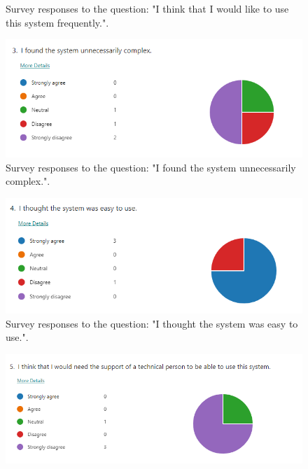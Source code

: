 \documentclass{l4proj}
\begin{document}
\begin{appendices}
\begin{figure}[h]
    \caption{Survey responses to the question: "I think that I would like to use this system frequently.".}
    \label{fig:usability1} 
\end{figure}

\begin{figure}[h]
    \centering
    \includegraphics[width=0.9\linewidth]{images/usability2.png}    

    \caption{Survey responses to the question: "I found the system unnecessarily complex.".}
    \label{fig:usability2} 
\end{figure}

\begin{figure}[h]
    \centering
    \includegraphics[width=0.9\linewidth]{images/usability3.png}    

    \caption{Survey responses to the question: "I thought the system was easy to use.".}
    \label{fig:usability3} 
\end{figure}

\begin{figure}[h]
    \centering
    \includegraphics[width=0.9\linewidth]{images/usability4.png}    


\end{figure}
\end{appendices}
\end{document}
